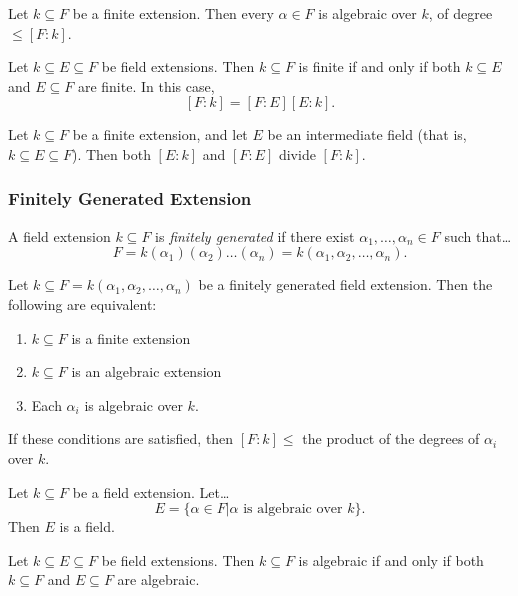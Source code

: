 \begin{lemma}
Let $k \subseteq F$ be a finite extension. Then every $\alpha \in F$ is algebraic over $k$, of degree $\leq [F:k]$.
\end{lemma}

\begin{proposition}
Let $k \subseteq E \subseteq F$ be field extensions. Then $k \subseteq F$ is finite if and only if both $k\subseteq E$ and $E \subseteq F$
are finite. In this case,
$$[F:k] = [F:E][E:k].$$
\end{proposition}

\begin{corollary}
Let $k \subseteq F$ be a finite extension, and let $E$ be an intermediate field (that is, $k \subseteq E \subseteq F$).
Then both $[E : k]$ and $[F : E]$ divide $[F : k]$.
\end{corollary}

\subsubsection{Finitely Generated Extension}\label{finitelygenext}
A field extension $k \subseteq F$ is \emph{finitely generated} if there exist $\alpha_1, \dots, \alpha_n \in F$ such that\dots
$$F = k(\alpha_1)(\alpha_2)\dots(\alpha_n) = k(\alpha_1,\alpha_2,\dots,\alpha_n).$$

\begin{proposition}
Let $k \subseteq F = k(\alpha_1,\alpha_2,\dots,\alpha_n)$ be a finitely generated field extension. Then the
following are equivalent:
\begin{enumerate}
\item $k \subseteq F$ is a finite extension
\item $k \subseteq F$ is an algebraic extension
\item Each $\alpha_i$ is algebraic over $k$.
\end{enumerate}
If these conditions are satisfied, then $[F : k] \leq$ the product of the degrees of $\alpha_i$ over $k$.
\end{proposition}

\begin{corollary}
Let $k \subseteq F$ be a field extension. Let\dots
$$E = \{ \alpha \in F | \alpha \textrm{ is algebraic over } k \}.$$
Then $E$ is a field.
\end{corollary}

\begin{corollary}
Let $k \subseteq E \subseteq F$ be field extensions. Then $k \subseteq F$ is algebraic if
and only if both $k \subseteq F$ and $E \subseteq F$ are algebraic.
\end{corollary}


